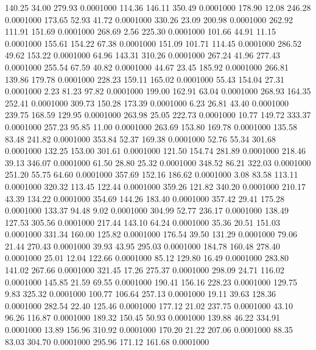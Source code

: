  140.25   34.00  279.93   0.0001000
 114.36  146.11  350.49   0.0001000
 178.90   12.08  246.28   0.0001000
 173.65   52.93   41.72   0.0001000
 330.26   23.09  200.98   0.0001000
 262.92  111.91  151.69   0.0001000
 268.69    2.56  225.30   0.0001000
 101.66   44.91   11.15   0.0001000
 155.61  154.22   67.38   0.0001000
 151.09  101.71  114.45   0.0001000
 286.52   49.62  153.22   0.0001000
  64.96  143.31  310.26   0.0001000
 267.24   41.96  277.43   0.0001000
 255.54   67.59   40.82   0.0001000
  44.67   23.45  185.92   0.0001000
 266.81  139.86  179.78   0.0001000
 228.23  159.11  165.02   0.0001000
  55.43  154.04   27.31   0.0001000
   2.23   81.23   97.82   0.0001000
 199.00  162.91   63.04   0.0001000
 268.93  164.35  252.41   0.0001000
 309.73  150.28  173.39   0.0001000
   6.23   26.81   43.40   0.0001000
 239.75  168.59  129.95   0.0001000
 263.98   25.05  222.73   0.0001000
  10.77  149.72  333.37   0.0001000
 257.23   95.85   11.00   0.0001000
 263.69  153.80  169.78   0.0001000
 135.58   83.48  241.82   0.0001000
 353.84   52.37  169.38   0.0001000
  52.76   55.34  301.68   0.0001000
 132.25  153.00  301.61   0.0001000
 121.50  154.74  281.89   0.0001000
 218.46   39.13  346.07   0.0001000
  61.50   28.80   25.32   0.0001000
 348.52   86.21  322.03   0.0001000
 251.20   55.75   64.60   0.0001000
 357.69  152.16  186.62   0.0001000
   3.08   83.58  113.11   0.0001000
 320.32  113.45  122.44   0.0001000
 359.26  121.82  340.20   0.0001000
 210.17   43.39  134.22   0.0001000
 354.69  144.26  183.40   0.0001000
 357.42   29.41  175.28   0.0001000
 133.37   94.48    9.02   0.0001000
 304.99   52.77  236.17   0.0001000
 138.49  127.53  305.56   0.0001000
 217.44  143.10   64.24   0.0001000
  35.36   20.51  151.03   0.0001000
 331.34  160.00  125.82   0.0001000
 176.54   39.50  131.29   0.0001000
  79.06   21.44  270.43   0.0001000
  39.93   43.95  295.03   0.0001000
 184.78  160.48  278.40   0.0001000
  25.01   12.04  122.66   0.0001000
  85.12  129.80   16.49   0.0001000
 283.80  141.02  267.66   0.0001000
 321.45   17.26  275.37   0.0001000
 298.09   24.71  116.02   0.0001000
 145.85   21.59   69.55   0.0001000
 190.41  156.16  228.23   0.0001000
 129.75    9.83  325.32   0.0001000
 100.77  106.64  257.13   0.0001000
  19.11   39.63  128.36   0.0001000
 282.54   22.40  125.46   0.0001000
 177.12   21.02  237.75   0.0001000
  43.10   96.26  116.87   0.0001000
 189.32  150.45   50.93   0.0001000
 139.88   46.22  334.91   0.0001000
  13.89  156.96  310.92   0.0001000
 170.20   21.22  207.06   0.0001000
  88.35   83.03  304.70   0.0001000
 295.96  171.12  161.68   0.0001000
